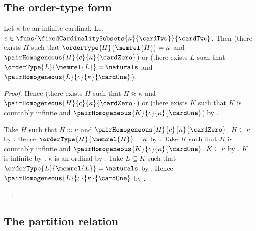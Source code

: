 \subsection{The order-type form}

\begin{theorem}\label{erdos_dushnik_miller_pair_order_type}
    Let $\kappa$ be an infinite cardinal.
    Let $c\in\funs{\fixedCardinalitySubsets{\kappa}{\cardTwo}}
        {\cardTwo}$.
    Then (there exists $H$ such that
            $\orderType{H}{\memrel{H}}=\kappa$ and
            $\pairHomogeneous{H}{c}{\kappa}{\cardZero}$) or
        (there exists $L$ such that
            $\orderType{L}{\memrel{L}}=\naturals$ and
            $\pairHomogeneous{L}{c}{\kappa}{\cardOne}$).
\end{theorem}
\begin{proof}
    Hence (there exists $H$ such that $H\approx\kappa$ and
            $\pairHomogeneous{H}{c}{\kappa}{\cardZero}$) or
        (there exists $K$ such that $K$ is countably infinite and
            $\pairHomogeneous{K}{c}{\kappa}{\cardOne}$) by
        .
    \begin{byCase}
            Take $H$ such that $H\approx\kappa$ and
                $\pairHomogeneous{H}{c}{\kappa}{\cardZero}$.
            $H\subseteq\kappa$ by .
            Hence $\orderType{H}{\memrel{H}}=\kappa$ by
                .
            Take $K$ such that $K$ is countably infinite and
                $\pairHomogeneous{K}{c}{\kappa}{\cardOne}$.
            $K\subseteq\kappa$ by .
            $K$ is infinite by .
            $\kappa$ is an ordinal by
                .
            Take $L\subseteq K$ such that
                $\orderType{L}{\memrel{L}}=\naturals$ by
                .
            Hence $\pairHomogeneous{L}{c}{\kappa}{\cardOne}$ by
                .
    \end{byCase}
\end{proof}

\subsection{The partition relation}

